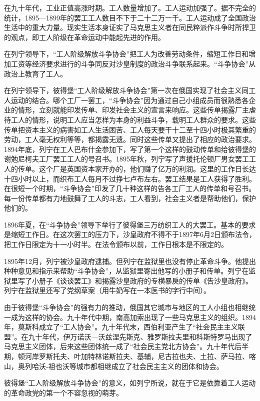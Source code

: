 在九十年代，工业正值高涨时期。工人数量增加了。工人运动加强了。据不完全的统计，1895—1899年的罢工工人数目不下于二十二万一千。工人运动成了全国政治生活中的重大力量。现实生活本身证实了马克思主义者在同民粹派作斗争时所捍卫的观点，即工人阶级在革命运动中能起先进的作用。

在列宁领导下，“工人阶级解放斗争协会”把工人为改善劳动条件，缩短工作日和增加工资等经济要求进行的斗争同反对沙皇制度的政治斗争联系起来。“斗争协会”从政治上教育了工人。

在列宁领导下，彼得堡“工人阶级解放斗争协会”第一次在俄国实现了社会主义同工人运动的结合。哪个工厂一罢工，“斗争协会”因为通过自己小组成员而很熟悉各企业的情形，立刻就能印发传单、印发社会主义的宣言来响应。这些传单揭露厂主虐待工人的情形，说明工人应当怎样为本身的利益斗争，载明工人群众的要求。这些传单把资本主义的病害如工人生活困苦、工人每天要干十二至十四小时极其繁重的劳动，工人毫无权利等等，都揭露无遗。同时这些传单又提出了相应的政治要求。1894年底，列宁在工人巴布什金参加下，写了第一个这样的鼓动传单和给彼得堡的谢勉尼柯夫工厂罢工工人的号召书。1895年秋，列宁写了声援托伦顿厂男女罢工工人的传单。这个厂是英国资本家开办的，他们赚了亿万的利润。这里的工作日长达十四小时以上，而织布工人每月不过挣七卢布左右。罢工结果是工人获得了胜利。在很短一个时期，“斗争协会”印发了几十种这样的告各工厂工人的传单和号召书。每一份传单都有力地鼓舞了工人的斗志，工人看到，社会主义者是帮助他们，保护他们的。

1896年夏，在“斗争协会”领导下举行了彼得堡三万纺织工人的大罢工。基本的要求是缩短工作日。在这次罢工的压力下，沙皇政府不得不于1897年6月2日颁布法令，把工作日限定为十一小时半。在法令颁布以前，工作日根本是不限定的。

1895年12月，列宁被沙皇政府逮捕。但列宁在监狱里也没有停止革命斗争。他提出种种意见和指示来帮助“斗争协会”，从监狱里寄出他写的小册子和传单。列宁在监狱里写了小册子《谈谈罢工》和揭露沙皇政府的专横暴戾的传单《告沙皇政府》。列宁在监狱里还写了党纲草案（用牛奶写在一本医书的字行中间）。

由于彼得堡“斗争协会”的强有力的推动，俄国其它城市与地区的工人小组也相继统一成为这样的协会。九十年代中期，南高加索出现了一些马克思主义的组织。1894年，莫斯科成立了“工人协会”。九十年代末，西伯利亚产生了“社会民主主义联盟”。在九十年代，伊万诺沃—沃兹涅先斯克、雅罗斯拉夫里和科斯特罗马出现了马克思主义团体，后来这些团体统一成了“社会民主党北方协会”。九十年代后半期，顿河岸罗斯托夫、叶加特林诺斯拉夫、基辅，尼古拉也夫、土拉、萨马拉、喀山，奥列哈沃-祖也沃等城市都相继成立了社会民主主义的团体和协会。

彼得堡“工人阶级解放斗争协会”的意义，如列宁所说，就在于它是依靠着工人运动的革命政党的第一个不容忽视的萌芽。

